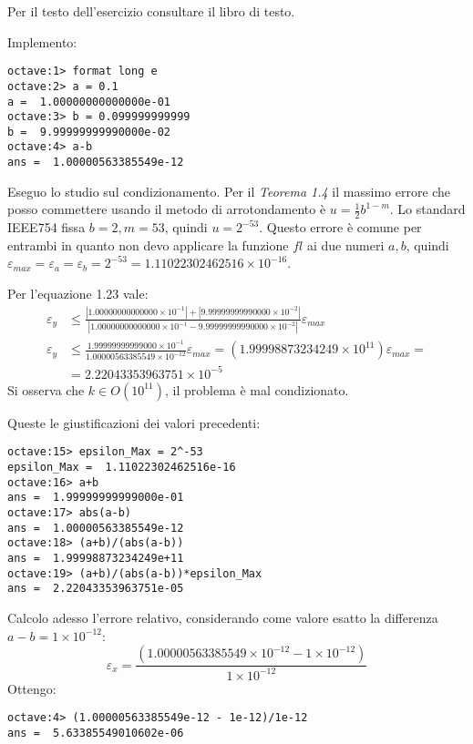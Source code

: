 \begin{exercise}[1.18]
\label{exercise:numericalEraseExercise}
Per il testo dell'esercizio consultare il libro di testo.
\end{exercise}
Implemento:
\begin{lstlisting}
octave:1> format long e
octave:2> a = 0.1
a =  1.00000000000000e-01
octave:3> b = 0.099999999999
b =  9.99999999990000e-02
octave:4> a-b
ans =  1.00000563385549e-12
\end{lstlisting}
Eseguo lo studio sul condizionamento. Per il \emph{Teorema 1.4} il massimo errore
che posso commettere usando il metodo di arrotondamento \`e $u = \frac{1}{2}b^{1-m}$.
Lo standard IEEE754 fissa $b = 2, m = 53$, quindi $u = 2^{-53}$. Questo errore
\`e comune per entrambi in quanto non devo applicare la funzione $fl$ ai due numeri $a, b$,
quindi $\varepsilon_{max} = \varepsilon_{a} = \varepsilon_{b} = 2^{-53} = 
1.11022302462516 \times 10^{-16}$.

Per l'equazione 1.23 vale:
\begin{displaymath}
\begin{split}
	\varepsilon_{y} & \leq \frac{|1.00000000000000 \times 10^{-1}| + 
			|9.99999999990000 \times 10^{-2}|}
		{|1.00000000000000 \times 10^{-1} - 
			9.99999999990000 \times 10^{-2}|}\varepsilon_{max} \\
	\varepsilon_{y} & \leq \frac{1.99999999999000\times 10^{-1}}
		{1.00000563385549\times 10^{-12}}\varepsilon_{max} = 
		(1.99998873234249\times 10^{11})\varepsilon_{max} = \\
	& = 2.22043353963751\times 10^{-5}
\end{split}
\end{displaymath}
Si osserva che $k \in O(10^{11})$, il problema \`e mal condizionato.

Queste le giustificazioni dei valori precedenti:
\begin{lstlisting}
octave:15> epsilon_Max = 2^-53
epsilon_Max =  1.11022302462516e-16
octave:16> a+b
ans =  1.99999999999000e-01
octave:17> abs(a-b)
ans =  1.00000563385549e-12
octave:18> (a+b)/(abs(a-b))
ans =  1.99998873234249e+11
octave:19> (a+b)/(abs(a-b))*epsilon_Max
ans =  2.22043353963751e-05
\end{lstlisting}

Calcolo adesso l'errore relativo, considerando come valore esatto la differenza
$a - b = 1 \times 10^{-12}$:
\begin{displaymath}
	\varepsilon_{x} = \frac{(1.00000563385549 \times 10^{-12} - 1 \times
	10^{-12})}{1 \times 10^{-12}}
\end{displaymath}
Ottengo:
\begin{lstlisting}
octave:4> (1.00000563385549e-12 - 1e-12)/1e-12
ans =  5.63385549010602e-06
\end{lstlisting}
















